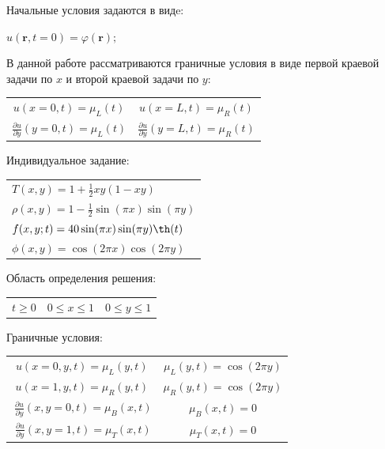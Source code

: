 \documentclass[a4paper,12pt]{article}
\begin{document}
Начальные условия задаются в видe:
\begin{center}
	$u(\textbf{r}, t = 0) = \varphi (\textbf{r});$
\end{center}
В данной работе рассматриваются граничные условия в виде первой краевой задачи по $x$ и второй краевой задачи по $y$:
\begin{center}
	\begin{tabular}{c c}
		$u(x = 0, t) = \mu_L (t)$&$ u(x = L, t) = \mu_R (t)$ \\
		$\displaystyle \frac{\partial u }{\partial y}(y = 0, t) = \mu_L (t)$&$\displaystyle \frac{\partial u }{\partial y} (y = L, t) = \mu_R (t)$
	\end{tabular}
\end{center}

\newpage
Индивидуальное задание:
\begin{center}
	\begin{tabular}{l}
		$T (x, y) = 1 + \frac{1}{2} xy(1 - xy)$\\
		$\rho(x, y) = 1 - \frac{1}{2} \sin(\pi x) \sin(\pi y)$ \\
		$f( x, y; t) = 40 \sin(\pi x) \sin( \pi y) \th(t)$\\
		$\phi( x, y) =  \cos(2\pi x) \cos(2 \pi y) $
	\end{tabular}
\end{center}

Область определения решения:
\begin{center}
	\begin{tabular}{c c c }
		$	t \geq 0 $&
		$	0 \leq x \leq 1 $&
		$	0 \leq y \leq 1$
	\end{tabular}
\end{center}
Граничные условия:
\begin{center}
	\begin{tabular}{c c }
		$u(x = 0, y, t) = \mu_L (y, t)$& $\mu_L (y, t) = \cos(2\pi y)$\\
		$u(x = 1, y, t) = \mu_R (y, t)$& $\mu_R (y, t) = \cos(2\pi y)$\\
		$\  \frac{\partial u }{\partial y} (x, y = 0, t) = \mu_B (x, t)$ &$\mu_B (x, t) = 0$\\
		$\  \frac{\partial u }{\partial y} (x, y = 1, t) = \mu_T (x, t)$ &$\mu_T (x, t) = 0$\\
	\end{tabular}
\end{center}






\newpage
\end{document}
